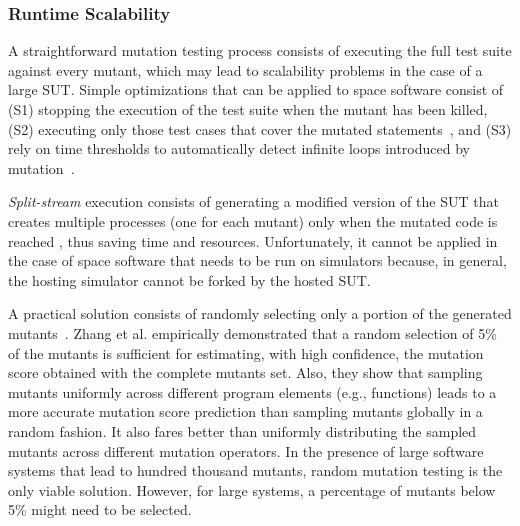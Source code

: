 \subsubsection{Runtime Scalability}
\label{sec:scalability}

A straightforward mutation testing process consists of executing the full test suite against every mutant, which may lead to scalability problems in the case of a large SUT.
Simple optimizations that can be applied to space software consist of (S1) stopping the execution of the test suite when the mutant has been killed, (S2) executing only those test cases that cover the mutated statements~\cite{delamaro1996proteum}, and (S3) rely on time thresholds to automatically detect infinite loops introduced by mutation~\cite{papadakis2019mutation}.

\emph{Split-stream} execution consists of generating a modified version of the SUT that creates multiple processes (one for each mutant) only when the mutated code is reached \cite{king1991fortran,tokumoto2016muvm}, thus saving time and resources. Unfortunately, it cannot be applied in the case of space software that needs to be run on simulators because, in general, the hosting simulator cannot be forked by the hosted SUT.

A practical solution consists of  randomly selecting only a portion of the generated mutants~\cite{zhang2010operator,gopinath2015hard,zhang2013operator}.
%
%
%
Zhang et al. \cite{zhang2013operator} empirically demonstrated that a random selection of 5\% of the mutants is sufficient for
estimating, with high confidence, the mutation score obtained with the complete mutants set.
Also,
they show that sampling mutants uniformly across different program elements (e.g., functions) %
leads to a more accurate mutation score prediction than sampling mutants globally in a random fashion. It also fares better than uniformly distributing the sampled mutants across different mutation operators. In the presence of large software systems that lead to hundred thousand mutants, random mutation testing is the only viable solution. However, for large systems, a percentage of mutants below 5\% might need to be selected.

